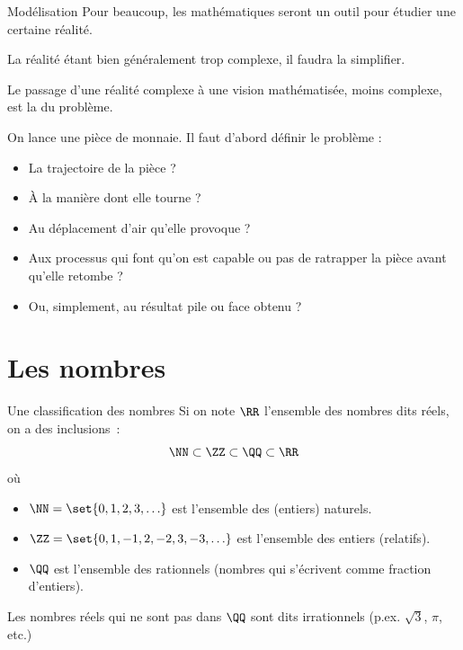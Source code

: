 \begin{frame}{Modélisation}
  Pour beaucoup, les mathématiques seront un outil pour étudier une certaine réalité.

  La réalité étant bien généralement trop complexe, il faudra la simplifier.\pause

  Le passage d'une réalité complexe à une vision mathématisée, moins complexe, est la  du problème.\pause

\begin{example}
  \og On lance une pièce de monnaie.\fg{} Il faut d'abord définir le problème :
  \begin{itemize}
  \item La trajectoire de la pièce ?
  \item À la manière dont elle tourne ?
  \item Au déplacement d'air qu'elle provoque ?
  \item Aux processus qui font qu'on est capable ou pas de ratrapper la pièce avant qu'elle retombe ?
  \item Ou, simplement, au résultat \og pile\fg{} ou \og face\fg{} obtenu ?
  \end{itemize}
\end{example}
\end{frame}

\section{Les nombres}
\begin{frame}{Une classification des nombres}
  Si on note \(\RR\) l'ensemble des nombres dits \og réels\fg{}, on a des inclusions~:
  \begin{equation*}
    \NN \subset \ZZ \subset  \QQ \subset \RR
  \end{equation*}
  où
  \begin{itemize}
  \item \(\NN = \set{0, 1, 2, 3, \ldots}\) est l'ensemble des (entiers) naturels.
  \item \(\ZZ = \set{0, 1, -1, 2,-2, 3,-3, \ldots}\) est l'ensemble des entiers (relatifs).
  \item \(\QQ\) est l'ensemble des rationnels (nombres qui s'écrivent comme fraction d'entiers).
  \end{itemize}\pause
  Les nombres réels qui ne sont pas dans \(\QQ\) sont dits \og irrationnels\fg{} (p.ex. \(\sqrt{3}\), \(\pi\), etc.)
\end{frame}

